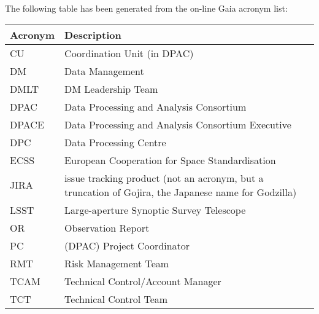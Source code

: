 The following table has been generated from the on-line Gaia acronym list:
\newline\newline%
\addtocounter{table}{-1}
\begin{longtable}{|l|p{}|}\hline
\textbf{Acronym} & \textbf{Description}  \\\hline
CU&Coordination Unit (in DPAC) \\\hline
DM&Data Management \\\hline
DMLT&DM Leadership Team \\\hline
DPAC&Data Processing and Analysis Consortium \\\hline
DPACE&Data Processing and Analysis Consortium Executive \\\hline
DPC&Data Processing Centre \\\hline
ECSS&European Cooperation for Space Standardisation \\\hline
JIRA&issue tracking product (not an acronym, but a truncation of Gojira, the Japanese name for Godzilla) \\\hline
LSST&Large-aperture Synoptic Survey Telescope \\\hline
OR&Observation Report \\\hline
PC&(DPAC) Project Coordinator \\\hline
RMT&Risk Management Team \\\hline
TCAM&Technical Control/Account Manager \\\hline
TCT&Technical Control Team \\\hline
\end{longtable}
